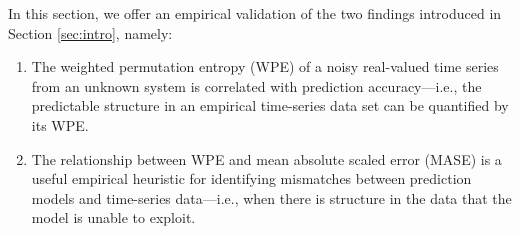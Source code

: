 


In this section, we offer an empirical validation of the two findings
introduced in Section \ref{sec:intro}, namely:

\begin{enumerate}

\item The weighted permutation entropy (WPE) of a noisy real-valued
  time series from an unknown system is correlated with prediction
  accuracy---i.e., the predictable structure in an empirical
  time-series data set can be quantified by its WPE.

\item The relationship between WPE and mean absolute scaled error
  (MASE) is a useful empirical heuristic for identifying mismatches
  between prediction models and time-series data---i.e., when there is
  structure in the data that the model is unable to exploit.

\end{enumerate}





